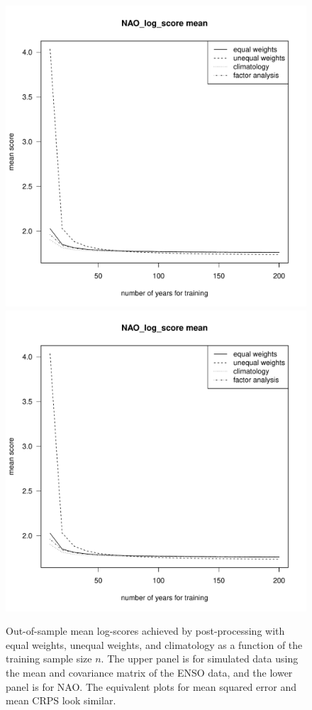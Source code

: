 \documentclass[12pt]{article}
\begin{document}
\begin{figure}
\begin{center}
\includegraphics[width=.6\textwidth, page=7]{../R/n-dependence.pdf}\\
\includegraphics[width=.6\textwidth, page=1]{../R/n-dependence.pdf}
\end{center}
\caption{Out-of-sample mean log-scores achieved by post-processing with equal weights, unequal weights, and climatology as a function of the training sample size $n$. The upper panel is for simulated data using the mean and covariance matrix of the ENSO data, and the lower panel is for NAO. The equivalent plots for mean squared error and mean CRPS look similar.}
\label{fig:se_vs_n}
\end{figure}
\end{document}
